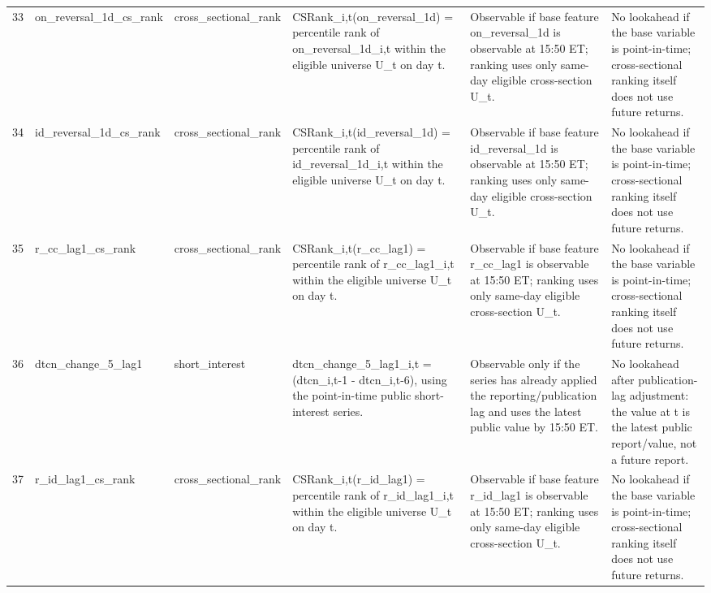 \begin{landscape}
\begin{longtable}{P{0.42cm} P{2.25cm} P{2.05cm} P{5.25cm} P{4.85cm} P{5.25cm}}
33 & on\_\allowbreak{}reversal\_\allowbreak{}1d\_\allowbreak{}cs\_\allowbreak{}rank & cross\_\allowbreak{}sectional\_\allowbreak{}rank & CSRank\_\allowbreak{}i,t(on\_\allowbreak{}reversal\_\allowbreak{}1d) = percentile rank of on\_\allowbreak{}reversal\_\allowbreak{}1d\_\allowbreak{}i,t within the eligible universe U\_\allowbreak{}t on day t. & Observable if base feature on\_\allowbreak{}reversal\_\allowbreak{}1d is observable at 15:50 ET; ranking uses only same-day eligible cross-section U\_\allowbreak{}t. & No lookahead if the base variable is point-in-time; cross-sectional ranking itself does not use future returns. \\
34 & id\_\allowbreak{}reversal\_\allowbreak{}1d\_\allowbreak{}cs\_\allowbreak{}rank & cross\_\allowbreak{}sectional\_\allowbreak{}rank & CSRank\_\allowbreak{}i,t(id\_\allowbreak{}reversal\_\allowbreak{}1d) = percentile rank of id\_\allowbreak{}reversal\_\allowbreak{}1d\_\allowbreak{}i,t within the eligible universe U\_\allowbreak{}t on day t. & Observable if base feature id\_\allowbreak{}reversal\_\allowbreak{}1d is observable at 15:50 ET; ranking uses only same-day eligible cross-section U\_\allowbreak{}t. & No lookahead if the base variable is point-in-time; cross-sectional ranking itself does not use future returns. \\
35 & r\_\allowbreak{}cc\_\allowbreak{}lag1\_\allowbreak{}cs\_\allowbreak{}rank & cross\_\allowbreak{}sectional\_\allowbreak{}rank & CSRank\_\allowbreak{}i,t(r\_\allowbreak{}cc\_\allowbreak{}lag1) = percentile rank of r\_\allowbreak{}cc\_\allowbreak{}lag1\_\allowbreak{}i,t within the eligible universe U\_\allowbreak{}t on day t. & Observable if base feature r\_\allowbreak{}cc\_\allowbreak{}lag1 is observable at 15:50 ET; ranking uses only same-day eligible cross-section U\_\allowbreak{}t. & No lookahead if the base variable is point-in-time; cross-sectional ranking itself does not use future returns. \\
36 & dtcn\_\allowbreak{}change\_\allowbreak{}5\_\allowbreak{}lag1 & short\_\allowbreak{}interest & dtcn\_\allowbreak{}change\_\allowbreak{}5\_\allowbreak{}lag1\_\allowbreak{}i,t = (dtcn\_\allowbreak{}i,t-1 - dtcn\_\allowbreak{}i,t-6), using the point-in-time public short-interest series. & Observable only if the series has already applied the reporting/publication lag and uses the latest public value by 15:50 ET. & No lookahead after publication-lag adjustment: the value at t is the latest public report/value, not a future report. \\
37 & r\_\allowbreak{}id\_\allowbreak{}lag1\_\allowbreak{}cs\_\allowbreak{}rank & cross\_\allowbreak{}sectional\_\allowbreak{}rank & CSRank\_\allowbreak{}i,t(r\_\allowbreak{}id\_\allowbreak{}lag1) = percentile rank of r\_\allowbreak{}id\_\allowbreak{}lag1\_\allowbreak{}i,t within the eligible universe U\_\allowbreak{}t on day t. & Observable if base feature r\_\allowbreak{}id\_\allowbreak{}lag1 is observable at 15:50 ET; ranking uses only same-day eligible cross-section U\_\allowbreak{}t. & No lookahead if the base variable is point-in-time; cross-sectional ranking itself does not use future returns. \\

\end{longtable}
\end{landscape}
